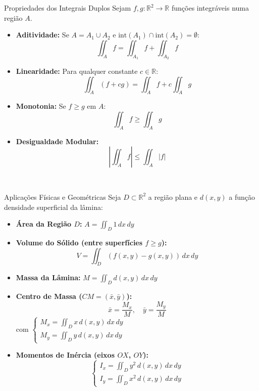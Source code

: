 \documentclass[11pt,a4paper]{article}
\newcommand{\R}{\mathbb{R}}
\begin{document}
\noindent\begin{minipage}[t]{0.49\textwidth}
  \begin{theorembox}{Propriedades dos Integrais Duplos}
    Sejam $f, g: \R^2 \to \R$ funções integráveis numa região $A$.
    \begin{itemize}
      \item \textbf{Aditividade:} Se $A = A_1 \cup A_2$ e $\text{int}(A_1) \cap \text{int}(A_2) = \emptyset$:
        \[ \iint_A f = \iint_{A_1} f + \iint_{A_2} f \]
      \item \textbf{Linearidade:} Para qualquer constante $c \in \R$:
        \[ \iint_A (f + cg) = \iint_A f + c\iint_A g \]
      \item \textbf{Monotonia:} Se $f \ge g$ em $A$:
        \[ \iint_A f \ge \iint_A g \]
      \item \textbf{Desigualdade Modular:}
        \[ \left| \iint_A f \right| \le \iint_A |f| \]
    \end{itemize}
  \end{theorembox}
\\ \textbf{} %
\end{minipage}\hfill
\begin{minipage}[t]{0.49\textwidth}
  \begin{formulabox}{Aplicações Físicas e Geométricas}
    Seja $D \subset \R^2$ a região plana e $d(x,y)$ a função densidade superficial da lâmina:
    \begin{itemize}
      \item \textbf{Área da Região $D$:} $A = \iint_D 1 \, dx \, dy$
      \item \textbf{Volume do Sólido (entre superfícies $f \ge g$):}
        \[ V = \iint_D (f(x, y) - g(x, y)) \, dx \, dy \]
      \item \textbf{Massa da Lâmina:} $M = \iint_D d(x, y) \, dx \, dy$
      \item \textbf{Centro de Massa ($CM = (\bar{x}, \bar{y})$):}
        \[ \bar{x} = \frac{M_x}{M}, \quad \bar{y} = \frac{M_y}{M} \]
        com $\begin{cases} M_x = \iint_D x \, d(x, y) \, dx \, dy \\ M_y = \iint_D y \, d(x, y) \, dx \, dy \end{cases}$
      \item \textbf{Momentos de Inércia (eixos $OX$, $OY$):}
        \[ \begin{cases} I_x = \iint_D y^2 \, d(x, y) \, dx \, dy \\ I_y = \iint_D x^2 \, d(x, y) \, dx \, dy \end{cases} \]
    \end{itemize}
  \end{formulabox}
\end{minipage}
\end{document}
